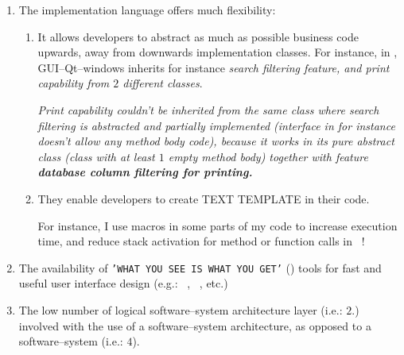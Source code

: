 \begin{enumerate}[1.]

	\item The implementation language \cplusplus
		offers much flexibility:
		
		\begin{enumerate}[1.]
			\item \emph{}
			
			It allows developers to abstract as much as possible
			business code upwards, away from downwards implementation
			classes. For instance,  in \yerotherpblack,
			GUI--Qt--windows inherits for instance
			\emph{search filtering feature, and print capability
			from $2$ different classes}.

			\emph{Print capability couldn't be inherited from the
			same class where search filtering is abstracted and
			partially implemented (interface in \Java for instance
			doesn't allow any method body code), because it works
			in its pure abstract class (\cplusplus class with at
			least $1$ empty method body) together with feature
			\textbf{database column filtering for printing.}}
			\newline
			
			\emph{}
			\newline
		
			\item \emph{}

			They enable developers to create TEXT TEMPLATE in their code.	
					
			For instance, I use macros in some parts of my code
			to increase execution time, and reduce stack activation for
			method or function calls in \yerotherpblack\ !						
			\newline
						
		\end{enumerate}						
		
	\item The availability of \texttt{'WHAT YOU SEE IS WHAT YOU GET'}
		(\wy) tools for fast and useful
		user interface design (e.g.: \qtdesigner~\cite{qtdesigner:2020},
		\ministudio~\cite{miniStudio:2020}, etc.)
		
	\item The low number of logical software--system architecture
		layer (i.e.: $2$.) involved with the use
		of a \thickclient software--system architecture, as
		opposed to a \webbrowserbased software--system (i.e.: $4$).
	
\end{enumerate}
